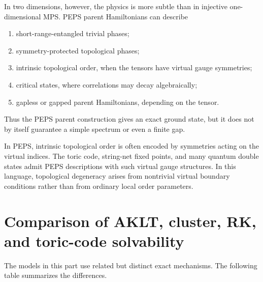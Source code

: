 In two dimensions, however, the physics is more subtle than in injective
one-dimensional MPS.  PEPS parent Hamiltonians can describe
\begin{enumerate}[label=(\roman*)]
    \item short-range-entangled trivial phases;
    \item symmetry-protected topological phases;
    \item intrinsic topological order, when the tensors have virtual gauge
    symmetries;
    \item critical states, where correlations may decay algebraically;
    \item gapless or gapped parent Hamiltonians, depending on the tensor.
\end{enumerate}
Thus the PEPS parent construction gives an exact ground state, but it does not
by itself guarantee a simple spectrum or even a finite gap.

\begin{remark}
In PEPS, intrinsic topological order is often encoded by symmetries acting on
the virtual indices.  The toric code, string-net fixed points, and many quantum
double states admit PEPS descriptions with such virtual gauge structures.  In
this language, topological degeneracy arises from nontrivial virtual boundary
conditions rather than from ordinary local order parameters.
\end{remark}

\section{Comparison of AKLT, cluster, RK, and toric-code solvability}
\label{sec:exact-ground-state-comparison}

The models in this part use related but distinct exact mechanisms.  The
following table summarizes the differences.

